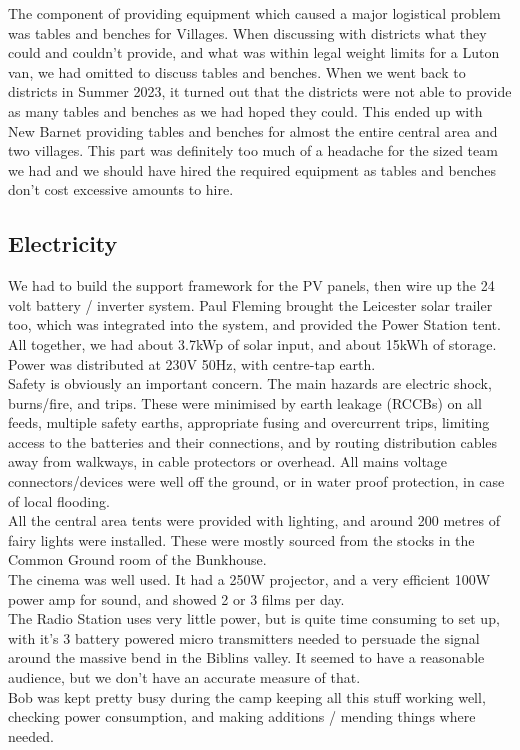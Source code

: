 The component of providing equipment which caused a major logistical problem was tables and benches for Villages. When discussing with districts what they could and couldn't provide, and what was within legal weight limits for a Luton van, we had omitted to discuss tables and benches. When we went back to districts in Summer 2023, it turned out that the districts were not able to provide as many tables and benches as we had hoped they could. This ended up with New Barnet providing tables and benches for almost the entire central area and two villages. This part was definitely too much of a headache for the sized team we had and we should have hired the required equipment as tables and benches don't cost excessive amounts to hire. 

\subsection{Electricity}
We had to build the support framework for the PV panels, then wire up the 24 volt battery / inverter system. Paul Fleming brought the Leicester solar trailer too, which was integrated into the system, and provided the Power Station tent. All together, we had about 3.7kWp of solar input, and about 15kWh of storage. Power was distributed at 230V 50Hz, with centre-tap earth.  \\


Safety  is obviously  an important concern. The main hazards are electric shock, burns/fire, and trips. These were minimised by earth leakage  (RCCBs) on all feeds, multiple safety earths, appropriate fusing and overcurrent trips, limiting access to the batteries and their connections, and by routing distribution cables away  from walkways,  in cable protectors or overhead. All mains voltage connectors/devices were well off the ground, or in water proof protection, in case of local flooding. \\


All the central area tents were provided with lighting, and around 200 metres of fairy lights were installed. These were mostly sourced from the stocks in the Common Ground room of the Bunkhouse.\\


The cinema was well used. It had a 250W projector, and a very efficient 100W power  amp for sound, and showed 2 or 3 films per day.\\


The Radio Station uses very little power, but is quite time consuming to set up, with it's 3 battery powered micro transmitters needed to persuade the signal around the massive bend in the Biblins valley.  It seemed to have a reasonable audience, but we don't  have an accurate measure of that.\\


Bob was kept pretty busy  during the camp keeping all this stuff working well, checking power consumption, and making additions / mending things where needed.
